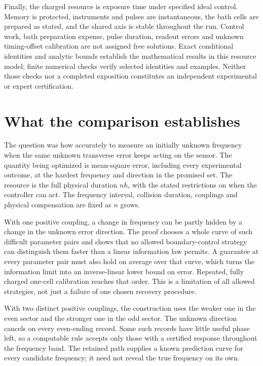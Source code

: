 \documentclass[11pt,a4paper]{article}
\numberwithin{equation}{section}
\theoremstyle{remark}
\begin{document}
Finally, the charged resource is exposure time under specified ideal control.
Memory is protected, instruments and pulses are instantaneous, the bath cells
are prepared as stated, and the shared axis is stable throughout the run.
Control work, bath preparation expense, pulse duration, readout errors and
unknown timing-offset calibration are not assigned free solutions. Exact
conditional identities and analytic bounds establish the mathematical
results in this resource model; finite numerical checks verify selected
identities and examples. Neither those checks nor a completed exposition
constitutes an independent experimental or expert certification.


\section{What the comparison establishes}
\label{end:synthesis}

The question was how accurately to measure an initially unknown frequency
when the same unknown transverse error keeps acting on the sensor. The
quantity being optimized is mean-square error, including every experimental
outcome, at the hardest frequency and direction in the promised set. The
resource is the full physical duration $nh$, with the stated restrictions
on when the controller can act. The frequency interval, collision duration,
couplings and physical compensation are fixed as $n$ grows.

With one positive coupling, a change in frequency can be partly hidden by
a change in the unknown error direction. The proof chooses a whole curve
of such difficult parameter pairs and shows that no allowed boundary-control
strategy can distinguish them faster than a linear information law permits.
A guarantee at every parameter pair must also hold on average over that
curve, which turns the information limit into an inverse-linear lower bound
on error. Repeated, fully charged one-cell calibration reaches that order.
This is a limitation of all allowed strategies, not just a failure of one
chosen recovery procedure.

With two distinct positive couplings, the construction uses the weaker one
in the even sector and the stronger one in the odd sector. The unknown
direction cancels on every even-ending record. Some such records have little
useful phase left, so a computable rule accepts only those with a certified
response throughout the frequency band. The retained path supplies a known
prediction curve for every candidate frequency; it need not reveal the true
frequency on its own.
\end{document}
